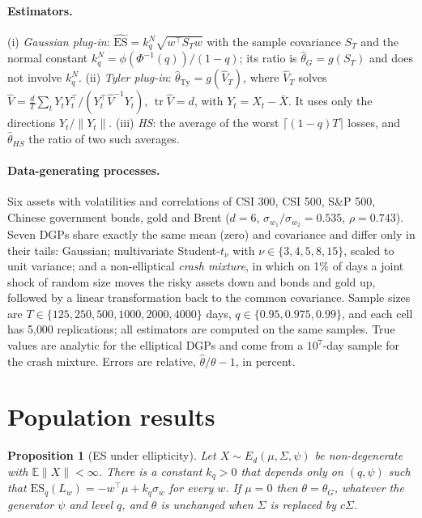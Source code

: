 \documentclass[11pt]{article}
\newcommand{\E}{\mathbb{E}}
\newcommand{\ES}{\mathrm{ES}}
\newcommand{\tr}{\operatorname{tr}}
\newtheorem{proposition}{Proposition}
\theoremstyle{remark}
\begin{document}
\paragraph{Estimators.}
(i) \emph{Gaussian plug-in}: $\widehat{\ES}=k^N_q\sqrt{w^\top S_Tw}$ with the sample covariance $S_T$ and the
normal constant $k^N_q=\phi(\Phi^{-1}(q))/(1-q)$; its ratio is $\hat\theta_G=g(S_T)$ and does not involve
$k^N_q$. (ii) \emph{Tyler plug-in}: $\hat\theta_{\mathrm{Ty}}=g(\hat V_T)$, where $\hat V_T$ solves
$\hat V=\frac dT\sum_t Y_tY_t^\top/(Y_t^\top\hat V^{-1}Y_t)$, $\tr\hat V=d$, with $Y_t=X_t-\bar X$. It uses only
the directions $Y_t/\|Y_t\|$. (iii) \emph{HS}: the average of the worst $\lceil(1-q)T\rceil$ losses, and
$\hat\theta_{HS}$ the ratio of two such averages.

\paragraph{Data-generating processes.}
Six assets with volatilities and correlations of CSI 300, CSI 500, S\&P 500, Chinese government bonds, gold
and Brent ($d=6$, $\sigma_{w_1}/\sigma_{w_2}=0.535$, $\rho=0.743$). Seven DGPs share exactly the same mean
(zero) and covariance and differ only in their tails: Gaussian; multivariate Student-$t_\nu$ with
$\nu\in\{3,4,5,8,15\}$, scaled to unit variance; and a non-elliptical \emph{crash mixture}, in which on 1\% of
days a joint shock of random size moves the risky assets down and bonds and gold up, followed by a linear
transformation back to the common covariance. Sample sizes are $T\in\{125,250,500,1000,2000,4000\}$ days,
$q\in\{0.95,0.975,0.99\}$, and each cell has 5{,}000 replications; all estimators are computed on the same
samples. True values are analytic for the elliptical DGPs and come from a $10^7$-day sample for the crash
mixture. Errors are relative, $\hat\theta/\theta-1$, in percent.

\section{Population results}\label{sec:pop}

\begin{proposition}[ES under ellipticity]\label{prop:es}
Let $X\sim E_d(\mu,\Sigma,\psi)$ be non-degenerate with $\E\|X\|<\infty$. There is a constant $k_q>0$ that
depends only on $(q,\psi)$ such that $\ES_q(L_w)=-w^\top\mu+k_q\sigma_w$ for every $w$. If $\mu=0$ then
$\theta=\theta_G$, whatever the generator $\psi$ and level $q$, and $\theta$ is unchanged when $\Sigma$ is
replaced by $c\Sigma$.
\end{proposition}
\end{document}
